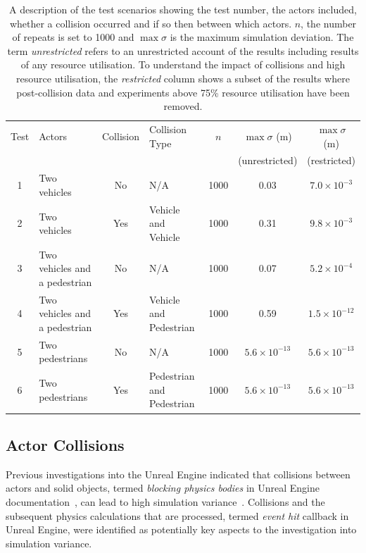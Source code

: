 
\begin{table}[t]
\centering
\begin{tabular}{clclccc}
\toprule
Test & Actors               & Collision    & Collision Type        & $n$  & $\max\sigma$ (m) & $\max\sigma$ (m) \\ 
   &                  &        &               &      & (unrestricted)  & (restricted)  \\ \midrule
1    & Two vehicles                   & No       & N/A               & 1000 & 0.03 & $7.0{\times}10^{-3}$ \\
2    & Two vehicles                   & Yes      & Vehicle and Vehicle     & 1000 & 0.31 & $9.8{\times}10^{-3}$ \\
3    & Two vehicles and a pedestrian  & No       & N/A               & 1000 & 0.07 & $5.2{\times}10^{-4}$ \\
4    & Two vehicles and a pedestrian  & Yes      & Vehicle and Pedestrian    & 1000 & 0.59 & $1.5{\times}10^{-12}$ \\
5    & Two pedestrians                & No       & N/A               & 1000 & $5.6{\times}10^{-13}$ & $5.6{\times}10^{-13}$ \\
6    & Two pedestrians                & Yes      & Pedestrian and Pedestrian & 1000 & $5.6{\times}10^{-13}$ & $5.6{\times}10^{-13}$ \\
\bottomrule
\end{tabular}
\caption{A description of the test scenarios showing the test number, the actors included, whether a collision occurred and if so then between which actors. $n$, the number of repeats is set to 1000 and $\max\sigma$ is the maximum simulation deviation. The term \textit{unrestricted} refers to an unrestricted account of the results including results of any resource utilisation. To understand the impact of collisions and high resource utilisation, the \textit{restricted} column shows a subset of the results where post-collision data and experiments above 75\% resource utilisation have been removed.}
\label{TableOfExperiments}
\end{table}

\subsection{Actor Collisions}\label{S:Actor_Collisions}
Previous investigations into the Unreal Engine indicated that collisions between actors and solid objects, termed \textit{blocking physics bodies} in Unreal Engine documentation~\cite{collision_overview}, can lead to high simulation variance~\cite{TSLUnrealEngineTesting}. 
%
Collisions and the subsequent physics calculations that are processed, termed \textit{event hit} callback in Unreal Engine, were identified as potentially key aspects to the investigation into simulation variance.

